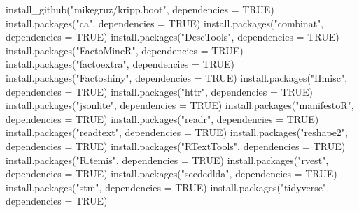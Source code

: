 \documentclass[
]{article}
\newenvironment{Shaded}{\begin{snugshade}}{\end{snugshade}}
\newcommand{\AttributeTok}[1]{\textcolor[rgb]{0.77,0.63,0.00}{#1}}
\newcommand{\ConstantTok}[1]{\textcolor[rgb]{0.00,0.00,0.00}{#1}}
\newcommand{\FunctionTok}[1]{\textcolor[rgb]{0.00,0.00,0.00}{#1}}
\newcommand{\NormalTok}[1]{#1}
\newcommand{\StringTok}[1]{\textcolor[rgb]{0.31,0.60,0.02}{#1}}
\begin{document}
\begin{Shaded}
\begin{Highlighting}[]
\FunctionTok{install\_github}\NormalTok{(}\StringTok{"mikegruz/kripp.boot"}\NormalTok{, }\AttributeTok{dependencies =} \ConstantTok{TRUE}\NormalTok{)}
\FunctionTok{install.packages}\NormalTok{(}\StringTok{"ca"}\NormalTok{, }\AttributeTok{dependencies =} \ConstantTok{TRUE}\NormalTok{)}
\FunctionTok{install.packages}\NormalTok{(}\StringTok{"combinat"}\NormalTok{, }\AttributeTok{dependencies =} \ConstantTok{TRUE}\NormalTok{)}
\FunctionTok{install.packages}\NormalTok{(}\StringTok{"DescTools"}\NormalTok{, }\AttributeTok{dependencies =} \ConstantTok{TRUE}\NormalTok{)}
\FunctionTok{install.packages}\NormalTok{(}\StringTok{"FactoMineR"}\NormalTok{, }\AttributeTok{dependencies =} \ConstantTok{TRUE}\NormalTok{)}
\FunctionTok{install.packages}\NormalTok{(}\StringTok{"factoextra"}\NormalTok{, }\AttributeTok{dependencies =} \ConstantTok{TRUE}\NormalTok{)}
\FunctionTok{install.packages}\NormalTok{(}\StringTok{"Factoshiny"}\NormalTok{, }\AttributeTok{dependencies =} \ConstantTok{TRUE}\NormalTok{)}
\FunctionTok{install.packages}\NormalTok{(}\StringTok{"Hmisc"}\NormalTok{, }\AttributeTok{dependencies =} \ConstantTok{TRUE}\NormalTok{)}
\FunctionTok{install.packages}\NormalTok{(}\StringTok{"httr"}\NormalTok{, }\AttributeTok{dependencies =} \ConstantTok{TRUE}\NormalTok{)}
\FunctionTok{install.packages}\NormalTok{(}\StringTok{"jsonlite"}\NormalTok{, }\AttributeTok{dependencies =} \ConstantTok{TRUE}\NormalTok{)}
\FunctionTok{install.packages}\NormalTok{(}\StringTok{"manifestoR"}\NormalTok{, }\AttributeTok{dependencies =} \ConstantTok{TRUE}\NormalTok{)}
\FunctionTok{install.packages}\NormalTok{(}\StringTok{"readr"}\NormalTok{, }\AttributeTok{dependencies =} \ConstantTok{TRUE}\NormalTok{)}
\FunctionTok{install.packages}\NormalTok{(}\StringTok{"readtext"}\NormalTok{, }\AttributeTok{dependencies =} \ConstantTok{TRUE}\NormalTok{)}
\FunctionTok{install.packages}\NormalTok{(}\StringTok{"reshape2"}\NormalTok{, }\AttributeTok{dependencies =} \ConstantTok{TRUE}\NormalTok{)}
\FunctionTok{install.packages}\NormalTok{(}\StringTok{"RTextTools"}\NormalTok{, }\AttributeTok{dependencies =} \ConstantTok{TRUE}\NormalTok{)}
\FunctionTok{install.packages}\NormalTok{(}\StringTok{"R.temis"}\NormalTok{, }\AttributeTok{dependencies =} \ConstantTok{TRUE}\NormalTok{)}
\FunctionTok{install.packages}\NormalTok{(}\StringTok{"rvest"}\NormalTok{, }\AttributeTok{dependencies =} \ConstantTok{TRUE}\NormalTok{)}
\FunctionTok{install.packages}\NormalTok{(}\StringTok{"seededlda"}\NormalTok{, }\AttributeTok{dependencies =} \ConstantTok{TRUE}\NormalTok{)}
\FunctionTok{install.packages}\NormalTok{(}\StringTok{"stm"}\NormalTok{, }\AttributeTok{dependencies =} \ConstantTok{TRUE}\NormalTok{)}
\FunctionTok{install.packages}\NormalTok{(}\StringTok{"tidyverse"}\NormalTok{, }\AttributeTok{dependencies =} \ConstantTok{TRUE}\NormalTok{)}
\end{Highlighting}
\end{Shaded}
\end{document}
